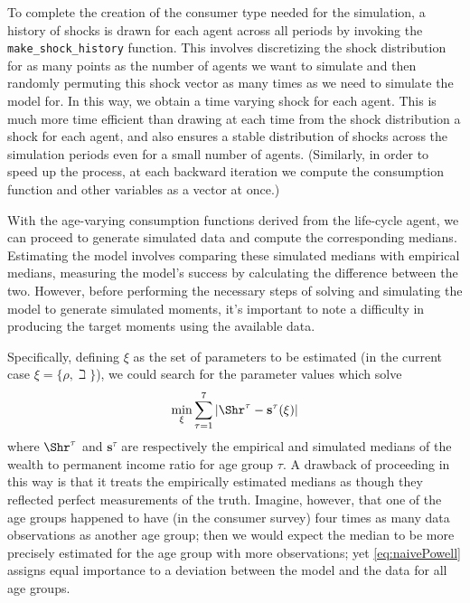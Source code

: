 \documentclass[titlepage, headings=optiontotocandhead]{Resources/texmf-local/tex/latex/econtex}
\begin{document}
To complete the creation of the consumer type needed for the simulation, a history of shocks is drawn for each agent across all periods by invoking the \texttt{make\_shock\_history} function. This involves discretizing the shock distribution for as many points as the number of agents we want to simulate and then randomly permuting this shock vector as many times as we need to simulate the model for. In this way, we obtain a time varying shock for each agent. This is much more time efficient than drawing at each time from the shock distribution a shock for each agent, and also ensures a stable distribution of shocks across the simulation periods even for a small number of agents. (Similarly, in order to speed up the process, at each backward iteration we compute the consumption function and other variables as a vector at once.)

With the age-varying consumption functions derived from the life-cycle agent, we can proceed to generate simulated data and compute the corresponding medians.  Estimating the model involves comparing these simulated medians with empirical medians, measuring the model's success by calculating the difference between the two.  However, before performing the necessary steps of solving and simulating the model to generate simulated moments, it's important to note a difficulty in producing the target moments using the available data.

Specifically, defining $\xi$ as the set of parameters
to be estimated (in the current case $\xi =\{\rho ,\beth\}$), we could search for
the parameter values which solve
  \begin{equation}
    \begin{gathered}
      \begin{aligned}
        \min_{\xi} \sum_{\tau=1}^{7} |\Shr^{\tau} -\mathbf{s}^{\tau}(\xi)|  \label{eq:naivePowell}
      \end{aligned}
    \end{gathered}
  \end{equation}
where $\Shr^{\tau }$ and $\mathbf{s}^{\tau}$ are respectively the empirical
and simulated medians of the wealth to permanent income ratio for age group $\tau$.
A drawback of proceeding in this way is that it treats the empirically
estimated medians as though they reflected perfect measurements of the
truth. Imagine, however, that one of the age groups happened to have
(in the consumer survey) four times as many data observations as
another age group; then we would expect the median to be more
precisely estimated for the age group with more observations; yet
\eqref{eq:naivePowell} assigns equal importance to a deviation between
the model and the data for all age groups.
\end{document}
